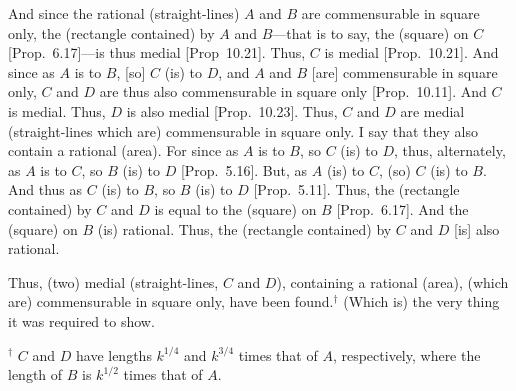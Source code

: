 \begin{Parallel}{}{}
{And since the rational (straight-lines) $A$ and $B$ are commensurable in square only,  the (rectangle contained) by $A$ and $B$---that is to
say, the (square) on $C$ [Prop.~6.17]---is thus medial
[Prop~10.21]. Thus, $C$ is medial
[Prop.~10.21]. And since as $A$ is to $B$, [so]
$C$ (is) to $D$, and $A$ and $B$ [are] commensurable in square only, 
$C$ and $D$ are thus also commensurable in square only [Prop.~10.11]. And $C$ is medial.
Thus, $D$ is also medial [Prop.~10.23]. 
Thus, $C$ and $D$ are medial (straight-lines which are) commensurable
in square only. I say that they also contain a rational (area).
For since as $A$ is to $B$, so $C$ (is) to $D$, thus, alternately,
as $A$ is to $C$, so $B$ (is) to $D$ [Prop.~5.16]. 
But, as $A$ (is) to $C$, (so) $C$ (is) to $B$. 
And thus as $C$ (is) to $B$, so $B$ (is) to $D$ [Prop.~5.11].
 Thus, the (rectangle contained) by $C$ and $D$ is equal to the (square) on $B$ [Prop.~6.17]. And the (square) on $B$ (is) rational. Thus, the (rectangle contained) by $C$ and $D$ [is] also rational.
 
Thus, (two) medial (straight-lines, $C$ and $D$), containing a rational (area), (which are) commensurable in square only, have been found.$^\dag$ (Which is) the very thing it was required to show.}
\end{Parallel}
{\footnotesize\noindent$^\dag$ $C$ and $D$ have lengths $k^{1/4}$ and $k^{3/4}$ times that of $A$, respectively, where the length of $B$ is $k^{1/2}$ times that of $A$.}

